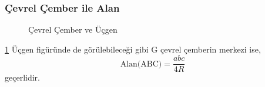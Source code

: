 \subsubsection{Çevrel Çember ile Alan}
\begin{figure}[h!]
    \centering
    \caption{Çevrel Çember ve Üçgen}
    \label{fig:circumtrig}
\end{figure}

\ref{fig:circumtrig} Üçgen figüründe de görülebileceği gibi G çevrel çemberin merkezi ise,
\begin{equation}
    \text{Alan(ABC)} = \frac{abc}{4R}
\end{equation}
geçerlidir.